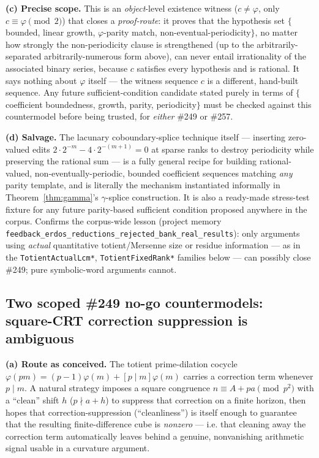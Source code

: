 \documentclass[11pt]{article}
\theoremstyle{plain}
\theoremstyle{definition}
\theoremstyle{remark}
\begin{document}
\textbf{(c) Precise scope.} This is an \emph{object}-level existence witness
(\(c\ne\varphi\), only \(c\equiv\varphi\pmod2\)) that closes a
\emph{proof-route}: it proves that the hypothesis set \(\{\)bounded, linear
growth, \(\varphi\)-parity match, non-eventual-periodicity\(\}\), no matter
how strongly the non-periodicity clause is strengthened (up to the
arbitrarily-separated arbitrarily-numerous form above), can never entail
irrationality of the associated binary series, because \(c\) satisfies every
hypothesis and is rational. It says nothing about \(\varphi\) itself — the
witness sequence \(c\) is a different, hand-built sequence. Any future
sufficient-condition candidate stated purely in terms of \(\{\)coefficient
boundedness, growth, parity, periodicity\(\}\) must be checked against this
countermodel before being trusted, for \emph{either} \#249 or \#257.

\textbf{(d) Salvage.} The lacunary coboundary-splice technique itself —
inserting zero-valued edits \(2\cdot2^{-m}-4\cdot2^{-(m+1)}=0\) at sparse
ranks to destroy periodicity while preserving the rational sum — is a fully
general recipe for building rational-valued, non-eventually-periodic,
bounded coefficient sequences matching \emph{any} parity template, and is
literally the mechanism instantiated informally in
Theorem~\ref{thm:gamma}'s \(\gamma\)-splice construction. It is also a
ready-made stress-test fixture for any future parity-based sufficient
condition proposed anywhere in the corpus. Confirms the corpus-wide lesson
(project memory \texttt{feedback\_erdos\_reductions\_rejected\_bank\_real\_results}):
only arguments using \emph{actual} quantitative totient/Mersenne size or
residue information — as in the \texttt{TotientActualLcm*},
\texttt{TotientFixedRank*} families below — can possibly close \#249; pure
symbolic-word arguments cannot.

\subsection{Two scoped \#249 no-go countermodels: square-CRT correction
suppression is ambiguous}

\textbf{(a) Route as conceived.} The totient prime-dilation cocycle
\(\varphi(pm)=(p-1)\varphi(m)+[p\mid m]\varphi(m)\) carries a correction term
whenever \(p\mid m\). A natural strategy imposes a square congruence
\(n\equiv A+pa\pmod{p^2}\) with a ``clean'' shift \(h\) (\(p\nmid a+h\)) to
suppress that correction on a finite horizon, then hopes that
correction-suppression (``cleanliness'') is itself enough to guarantee that
the resulting finite-difference cube is \emph{nonzero} — i.e. that cleaning
away the correction term automatically leaves behind a genuine, nonvanishing
arithmetic signal usable in a curvature argument.
\end{document}
